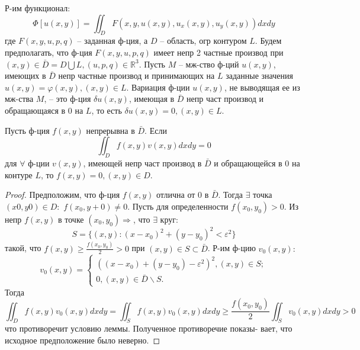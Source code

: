 Р-им функционал:
\begin{equation}
    \Phi[u(x, y)]=\iint_D F(x, y, u(x, y), u_x(x, y), u_y(x, y))dxdy
    \label{func2}
\end{equation}
где $F(x, y, u, p, q)$ – заданная ф-ция, а $D$ – область, огр контуром $L$. Будем предполагать, что ф-ция $F(x, y, u, p, q)$ имеет непр 2 частные производ при $(x, y) \in \bar D = D \bigcup L, (u, p, q) \in \mathbb{R}^3$. Пусть $M$ – мж-ство ф-ций $u(x, y)$, имеющих в $\bar D$ непр частные производ и принимающих на $L$ заданные значения $u(x, y) = \varphi(x, y),(x, y) \in L$. Вариация ф-ции $u(x, y)$, не выводящая ее из мж-ства $M$, – это ф-ция $\delta u(x, y)$, имеющая в $\bar D$ непр част производ и обращающаяся в 0 на $L$, то есть $\delta u(x, y) = 0,(x, y) \in L$.

\begin{lemma}
    Пусть ф-ция $f(x, y)$ непрерывна в $\bar D$. Если
    $$\iint_D f(x,y)v(x,y)dxdy=0$$
    для $\forall$ ф-ции $v(x, y)$, имеющей непр част производ в $\bar D$ и обращающейся в 0 на контуре $L$, то $f(x, y) = 0, (x, y) \in D$.
\end{lemma}
\begin{proof}
    Предположим, что ф-ция $f(x, y)$ отлична от 0
    в $\bar D$. Тогда $\exists$ точка $(x0, y0) \in D:$ $f(x_0, y+0)\neq0$. Пусть
    для определенности $f(x_0, y_0) > 0$. Из непр $f(x, y)$ в точке $(x_0, y_0)\Longrightarrow$, что $\exists$ круг: $$S = \{(x, y) : (x-x_0)^2 + (y-y_0)^2 < \varepsilon^2\}$$
    такой, что $f(x,y) \geq \frac{f(x_0,y_0)}{2}>0$ при $(x,y)\in S \subset \bar D$. Р-им ф-цию $v_0(x,y):$
    $$v_0(x,y)=\begin{cases}
        ((x-x_0) + (y-y_0)-\varepsilon^2)^2,  (x, y) \in S;\\
        0, (x,y)\in \bar D\backslash S.
    \end{cases}$$
    Тогда $$\iint_D f(x,y)v_0(x,y)dxdy=\iint_S f(x,y)v_0(x,y)dxdy \geq \frac{f(x_0,y_0)}{2}\iint_S v_0(x,y)dxdy>0$$
    что противоречит условию леммы. Полученное противоречие показы-
    вает, что исходное предположение было неверно.
\end{proof}

